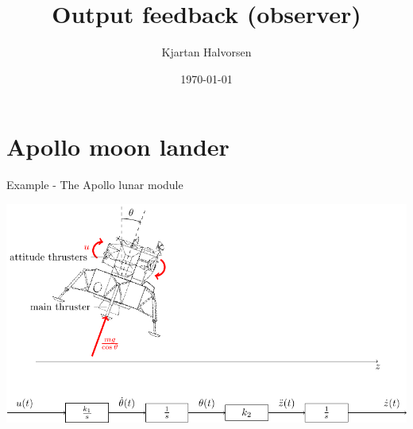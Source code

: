 \documentclass[presentation,aspectratio=1610]{beamer}
\author{Kjartan Halvorsen}
\date{\today}
\title{Output feedback (observer)}
\begin{document}
\maketitle

\section{Apollo moon lander}
\label{sec:orgcee211e}
\begin{frame}[label={sec:orgfba8330}]{Example - The Apollo lunar module}
\begin{center}
\includegraphics[width=\linewidth]{fig-apollo}
\end{center}
\end{frame}
\end{document}
